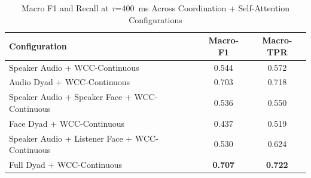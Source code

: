\begin{table}[h]
\caption{Macro F1 and Recall at $\tau$=400~ms Across Coordination + Self-Attention Configurations}
\label{tab:macro_csa}
\small
\renewcommand{\arraystretch}{1.20}
\begin{tabular}{>{\raggedright\arraybackslash}p{4cm}cc}
\toprule
Configuration & Macro-F1 & Macro-TPR \\
\midrule
Speaker Audio + WCC-Continuous & 0.544 & 0.572 \\
Audio Dyad + WCC-Continuous & 0.703 & 0.718 \\
Speaker Audio + Speaker Face + WCC-Continuous & 0.536 & 0.550 \\
Face Dyad + WCC-Continuous & 0.437 & 0.519 \\
Speaker Audio + Listener Face + WCC-Continuous & 0.530 & 0.624 \\
Full Dyad + WCC-Continuous & \textbf{0.707} & \textbf{0.722} \\
\bottomrule
\end{tabular}
\end{table}
